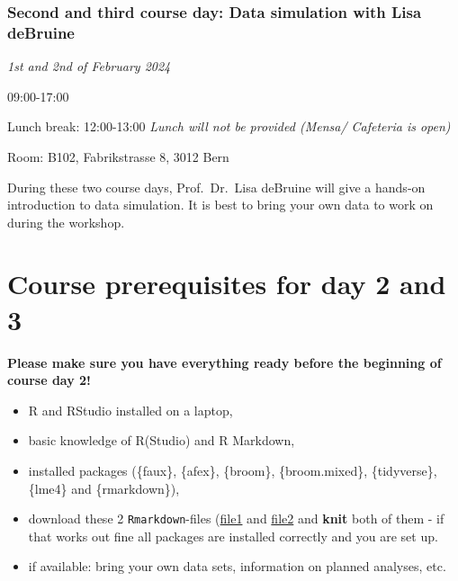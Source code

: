 \documentclass[
  letterpaper,
  DIV=11,
  numbers=noendperiod,
  oneside]{scrreprt}
\begin{document}
\hypertarget{second-and-third-course-day-data-simulation-with-lisa-debruine}{%
\subsubsection*{Second and third course day: Data simulation with Lisa
deBruine}\label{second-and-third-course-day-data-simulation-with-lisa-debruine}}

\emph{1st and 2nd of February 2024}

09:00-17:00

Lunch break: 12:00-13:00 \emph{Lunch will not be provided (Mensa/
Cafeteria is open)}

Room: B102, Fabrikstrasse 8, 3012 Bern

During these two course days, Prof.~Dr.~Lisa deBruine will give a
hands-on introduction to data simulation. It is best to bring your own
data to work on during the workshop.

\hypertarget{course-prerequisites-for-day-2-and-3}{%
\section*{Course prerequisites for day 2 and
3}\label{course-prerequisites-for-day-2-and-3}}


\textbf{Please make sure you have everything ready before the beginning
of course day 2!}

\begin{itemize}
\item
  R and RStudio installed on a laptop,
\item
  basic knowledge of R(Studio) and R Markdown,
\item
  installed packages (\{faux\}, \{afex\}, \{broom\}, \{broom.mixed\},
  \{tidyverse\}, \{lme4\} and \{rmarkdown\}),
\item
  download these 2 \texttt{Rmarkdown}-files
  (\href{./downloadable_files/faux-stub.Rmd}{file1} and
  \href{./downloadable_files/mixed-stub.Rmd}{file2} and \textbf{knit}
  both of them - if that works out fine all packages are installed
  correctly and you are set up.
\item
  if available: bring your own data sets, information on planned
  analyses, etc.
\end{itemize}
\end{document}
